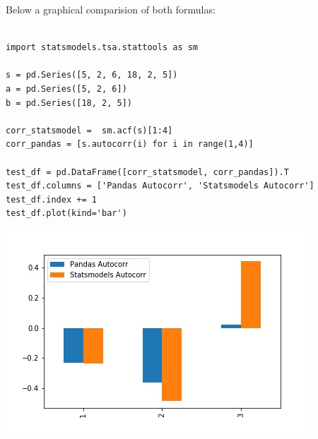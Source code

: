 Below a graphical comparision of both formulas:

\lstset{language=Python}
\lstset{frame=lines}
\lstset{basicstyle=\footnotesize}
\begin{lstlisting}

import statsmodels.tsa.stattools as sm

s = pd.Series([5, 2, 6, 18, 2, 5])
a = pd.Series([5, 2, 6])
b = pd.Series([18, 2, 5])

corr_statsmodel =  sm.acf(s)[1:4]
corr_pandas = [s.autocorr(i) for i in range(1,4)]

test_df = pd.DataFrame([corr_statsmodel, corr_pandas]).T
test_df.columns = ['Pandas Autocorr', 'Statsmodels Autocorr']
test_df.index += 1
test_df.plot(kind='bar')

\end{lstlisting}

\begin{center}
\includegraphics[scale=0.6]{corr_comparison.jpg}
\end{center}

\vspace{5mm}